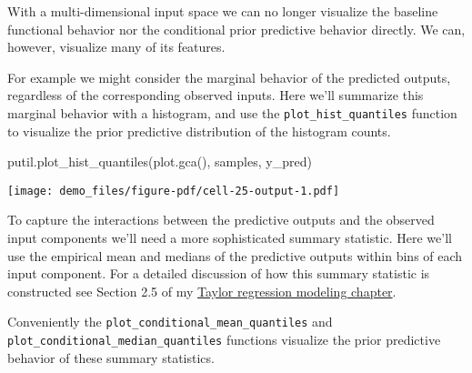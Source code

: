 \documentclass[
  letterpaper,
  DIV=11,
  numbers=noendperiod]{scrartcl}
\newenvironment{Shaded}{\begin{snugshade}}{\end{snugshade}}
\newcommand{\NormalTok}[1]{\textcolor[rgb]{0.00,0.23,0.31}{#1}}
\newcommand{\StringTok}[1]{\textcolor[rgb]{0.13,0.47,0.30}{#1}}
\begin{document}
With a multi-dimensional input space we can no longer visualize the
baseline functional behavior nor the conditional prior predictive
behavior directly. We can, however, visualize many of its features.

For example we might consider the marginal behavior of the predicted
outputs, regardless of the corresponding observed inputs. Here we'll
summarize this marginal behavior with a histogram, and use the
\texttt{plot\_hist\_quantiles} function to visualize the prior
predictive distribution of the histogram counts.

\begin{Shaded}
\begin{Highlighting}[]
\NormalTok{putil.plot\_hist\_quantiles(plot.gca(), samples, }\StringTok{\textquotesingle{}y\_pred\textquotesingle{}}\NormalTok{)}
\end{Highlighting}
\end{Shaded}

\texttt{[image: demo\_files/figure-pdf/cell-25-output-1.pdf]}

To capture the interactions between the predictive outputs and the
observed input components we'll need a more sophisticated summary
statistic. Here we'll use the empirical mean and medians of the
predictive outputs within bins of each input component. For a detailed
discussion of how this summary statistic is constructed see Section 2.5
of my
\href{https://betanalpha.github.io/assets/case_studies/taylor_models.html\#25_Posterior_Retrodictive_Checks}{Taylor
regression modeling chapter}.

Conveniently the \texttt{plot\_conditional\_mean\_quantiles} and
\texttt{plot\_conditional\_median\_quantiles} functions visualize the
prior predictive behavior of these summary statistics.
\end{document}
